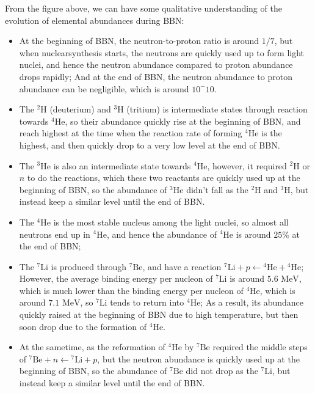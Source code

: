 \begin{intuition}
    From the figure above, we can have some qualitative understanding of the evolution of elemental abundances during BBN:
    \begin{itemize}
        \item At the beginning of BBN, the neutron-to-proton ratio is around $1/7$, but when nuclearsynthesis starts, the neutrons are quickly used up to form light nuclei, and hence the neutron abundance compared to proton abundance drops rapidly; And at the end of BBN, the neutron abundance to proton abundance can be negligible, which is around $10^-10$.
        \item The ${}^2\text{H}$ (deuterium) and ${}^3\text{H}$ (tritium) is intermediate states through reaction towards ${}^4\text{He}$, so their abundance quickly rise at the beginning of BBN, and reach highest at the time when the reaction rate of forming ${}^4\text{He}$ is the highest, and then quickly drop to a very low level at the end of BBN.
        \item The ${}^3\text{He}$ is also an intermediate state towards ${}^4\text{He}$, however, it required ${}^2\text{H}$ or $n$ to do the reactions, which these two reactants are quickly used up at the beginning of BBN, so the abundance of ${}^3\text{He}$  didn't fall as the ${}^2\text{H}$ and ${}^3\text{H}$, but instead keep a similar level until the end of BBN.
        \item The ${}^4\text{He}$ is the most stable nucleus among the light nuclei, so almost all neutrons end up in ${}^4\text{He}$, and hence the abundance of ${}^4\text{He}$ is around $25\%$ at the end of BBN; 
        \item The ${}^7\text{Li}$ is produced through ${}^7 \text{Be}$, and have a reaction ${}^7\text{Li} + p \leftarrow {}^4\text{He} + {}^4\text{He}$; However, the average binding energy per nucleon of ${}^7\text{Li}$ is around $5.6 \text{ MeV}$, which is much lower than the binding energy per nucleon of ${}^4\text{He}$, which is around $7.1 \text{ MeV}$, so ${}^7 \text{Li}$ tends to return into $^{4}\text{He}$; As a result, its abundance quickly raised at the beginning of BBN due to high temperature, but then soon drop due to the formation of ${}^4\text{He}$.
        \item At the sametime, as the reformation of ${}^4\text{He}$ by ${}^7\text{Be}$ required the middle steps of ${}^7 \text{Be} + n \leftarrow {}^7\text{Li} + p$, but the neutron abundance is quickly used up at the beginning of BBN, so the abundance of ${}^7\text{Be}$ did not drop as the ${}^7\text{Li}$, but instead keep a similar level until the end of BBN.
    \end{itemize}
\end{intuition}

